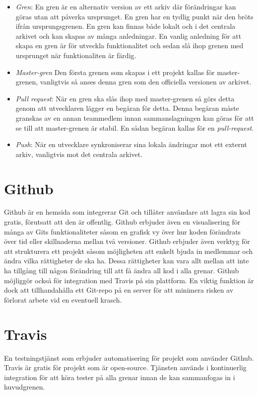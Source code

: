 \begin{itemize}
	\item \textit{Gren}: En gren är en alternativ version av ett arkiv där förändringar kan göras utan att påverka ursprunget. En gren har en tydlig punkt när den bröts ifrån ursprungsgrenen. En gren kan finnas både lokalt och i det centrala arkivet och kan skapas av många anledningar. En vanlig anledning för att skapa en gren är för utveckla funktionalitet och sedan slå ihop grenen med ursprunget när funktionaliten är färdig.

	\item\textit{Master-gren} Den första grenen som skapas i ett projekt kallas för master-grenen, vanligtvis så anses denna gren som den officiella versionen av arkivet.

	\item \textit{Pull request}: När en gren ska slås ihop med master-grenen så görs detta genom att utvecklaren lägger en begäran för detta. Denna begäran måste granskas av en annan teammedlem innan sammanslagningen kan göras för att se till att master-grenen är stabil. En sådan begäran kallas för en \textit{pull-request}.

	\item \textit{Push}: När en utvecklare synkroniserar sina lokala ändringar mot ett externt arkiv, vanligtvis mot det centrala arkivet.
\end{itemize}


\section{Github}
Github är en hemsida som integrerar Git och tillåter användare att lagra sin kod gratis, förutsatt att den är offentlig.\cite{Github} Github erbjuder även en visualisering för många av Gits funktionaliteter såsom en grafisk vy över hur koden förändrats över tid eller skillnaderna mellan två versioner. Github erbjuder även verktyg för att strukturera ett projekt såsom möjligheten att enkelt bjuda in medlemmar och ändra vilka rättigheter de ska ha. Dessa rättigheter kan vara allt mellan att inte ha tillgång till någon förändring till att få ändra all kod i alla grenar. Github möjliggör också för integration med Travis på sin plattform. En viktig funktion är dock att tillhandahålla ett Git-repo på en server för att minimera risken av förlorat arbete vid en eventuell krasch.

\section{Travis}
En testningstjänst som erbjuder automatisering för projekt som använder Github.\cite{Travis} Travis är gratis för projekt som är open-source. Tjänsten används i kontinuerlig integration för att köra tester på alla grenar innan de kan sammanfogas in i huvudgrenen.

